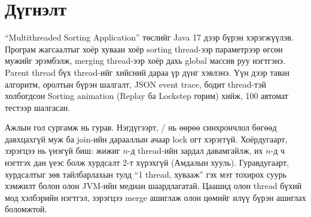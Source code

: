 \chapter{Дүгнэлт}\label{ch:concl}

“Multithreaded Sorting Application” төслийг Java 17 дээр бүрэн хэрэгжүүлэв. Програм жагсаалтыг хоёр хуваан хоёр
sorting thread-ээр параметрээр өгсөн мужийг эрэмбэлж, merging thread-ээр хоёр дахь global массив руу нэгтгэнэ. Parent
thread бүх thread-ийг  хийсний дараа үр дүнг хэвлэнэ. Үүн дээр таван алгоритм, оролтын бүрэн шалгалт,
JSON event trace, бодит thread-тэй холбогдсон Sorting animation (Replay ба Lockstep горим) хийж, 100 автомат тестээр
шалгасан.

Ажлын гол сургамж нь гурав. Нэгдүгээрт, / нь өөрөө синхрончлол бөгөөд давхцахгүй муж ба
join-ийн дарааллын ачаар lock огт хэрэггүй. Хоёрдугаарт, зэрэгцээ нь үнэгүй биш: жижиг $n$-д thread-ийн зардал
давамгайлж, их $n$-д ч нэгтгэх дан үеэс болж хурдсалт 2-т хүрэхгүй (Амдалын хууль). Гуравдугаарт, хурдсалтыг зөв
тайлбарлахын тулд “1 thread, хувааж” гэх мэт тохирох суурь хэмжилт болон олон JVM-ийн медиан шаардлагатай.
Цаашид олон thread бүхий мод хэлбэрийн нэгтгэл, зэрэгцээ merge ашиглаж олон цөмийг илүү бүрэн ашиглах боломжтой.
